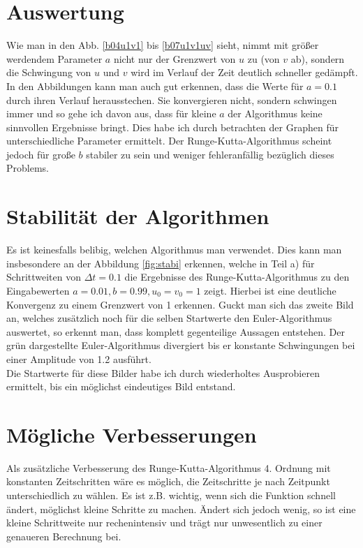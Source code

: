 \documentclass[12pt,a4paper,titlepage,headinclude,bibtotoc]{scrartcl}
\begin{document}
\section{Auswertung}
\label{sec:auswertung}
Wie man in den Abb. \ref{b04u1v1} bis \ref{b07u1v1uv} sieht, nimmt mit größer werdendem Parameter $a$ nicht nur der Grenzwert von $u$ zu (von $v$ ab), sondern die Schwingung von $u$ und $v$ wird im Verlauf der Zeit deutlich schneller gedämpft.
In den Abbildungen kann man auch gut erkennen, dass die Werte für $a=0.1$  durch ihren Verlauf herausstechen.
Sie konvergieren nicht, sondern schwingen immer  und so gehe ich davon aus, dass für kleine $a$ der Algorithmus keine sinnvollen Ergebnisse bringt.
Dies habe ich durch betrachten der Graphen für unterschiedliche Parameter ermittelt.
Der Runge-Kutta-Algorithmus scheint jedoch für große $b$ stabiler zu sein und weniger fehleranfällig bezüglich dieses Problems.



\section{Stabilität der Algorithmen}
Es ist keinesfalls belibig, welchen Algorithmus man verwendet.
Dies kann man insbesondere an der Abbildung \ref{fig:stabi} erkennen, welche in Teil a) für Schrittweiten von $\Delta t=0.1$ die Ergebnisse des Runge-Kutta-Algorithmus zu den Eingabewerten $a=0.01, b=0.99, u_0=v_0=1$ zeigt.
Hierbei ist eine  deutliche Konvergenz zu einem  Grenzwert von 1 erkennen.
Guckt man sich das zweite Bild an, welches zusätzlich noch für die selben Startwerte den Euler-Algorithmus auswertet, so erkennt man, dass komplett gegenteilige Aussagen entstehen.
Der grün dargestellte Euler-Algorithmus divergiert bis er konstante Schwingungen bei einer Amplitude von 1.2 ausführt.\\
Die Startwerte für diese Bilder habe ich durch wiederholtes Ausprobieren ermittelt, bis ein möglichst eindeutiges Bild entstand.



\section{Mögliche Verbesserungen}
Als zusätzliche Verbesserung des Runge-Kutta-Algorithmus 4. Ordnung mit konstanten Zeitschritten wäre es möglich, die Zeitschritte je nach Zeitpunkt unterschiedlich zu wählen.
Es ist z.B. wichtig, wenn sich die Funktion schnell ändert, möglichst kleine Schritte zu machen.
Ändert sich jedoch wenig, so ist eine kleine Schrittweite nur rechenintensiv und trägt nur unwesentlich zu einer genaueren Berechnung bei.
\end{document}
